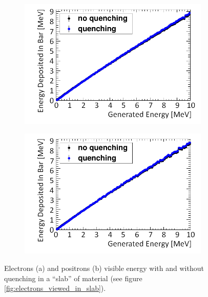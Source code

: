 \begin{figure}[!h]
\centering
\begin{subfigure}{.45\textwidth}
  \centering
  \includegraphics[width=\linewidth]{Chapter4/Figs/newQuenchPlots/e-BirksPolyQuenchingComparisonAdjustedMedText.png}
  \captionsetup{width=.9\linewidth}
  \caption{}
  \label{subFig:electron_quenched_and_not}
\end{subfigure}%
\begin{subfigure}{.45\textwidth}
  \centering
  \includegraphics[width=\linewidth]{Chapter4/Figs/newQuenchPlots/e+BirksPolyQuenchingComparisonAdjustedMedText.png}
  \captionsetup{width=.9\linewidth}
  \caption{}
  \label{subFig:positron_quenched_and_not}
\end{subfigure}
\caption{Electrons (a) and positrons (b) visible energy with and without quenching in a ``slab'' of material (see figure \ref{fig:electrons_viewed_in_slab}).}
\label{fig:electron_positron_quenched_and_not}
\end{figure}

